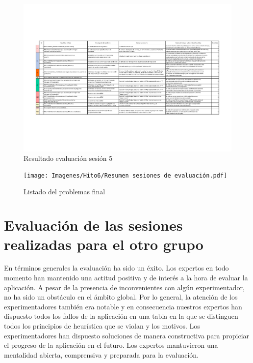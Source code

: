 \begin{figure}[H]
    \centering
    \includegraphics[angle=270,width=1.\textwidth]{Imagenes/Hito6/Evaluación Sesión 5.pdf}
    \caption{Resultado evaluación sesión 5}
    \label{fig:eva-s5}
\end{figure}

\begin{figure}[H]
    \centering
    \texttt{[image: Imagenes/Hito6/Resumen sesiones de evaluación.pdf]}
    \caption{Listado del problemas final}
    \label{fig:eva-fin}
\end{figure}

\newpage

\section{Evaluación de las sesiones realizadas para el otro grupo}
En términos generales la evaluación ha sido un éxito. Los expertos en todo momento han mantenido una actitud positiva y de interés a la hora de evaluar la aplicación. 
A pesar de la presencia de inconvenientes con algún experimentador, no ha sido un obstáculo en el ámbito global. Por lo general, la atención de los experimentadores 
también era notable y en consecuencia nuestros expertos han dispuesto todos los fallos de la aplicación en una tabla en la que se distinguen todos los principios 
de heurística que se violan y los motivos. Los experimentadores han dispuesto soluciones de manera constructiva para propiciar el progreso de la aplicación en 
el futuro. Los expertos mantuvieron una mentalidad abierta, comprensiva y preparada para la evaluación. \\

